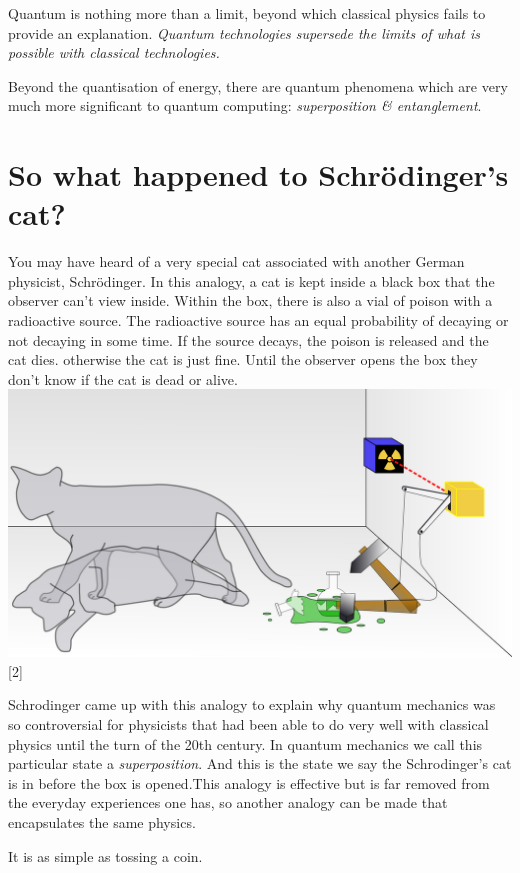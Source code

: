 \documentclass{book}
\begin{document}
Quantum is nothing more than a limit, beyond which classical physics fails to provide an explanation. \textit{Quantum technologies supersede the limits of what is possible with classical technologies.}

Beyond the quantisation of energy, there are quantum phenomena which are very much more significant to quantum computing: \textit{superposition \& entanglement}. 

\section{So what happened to Schrödinger’s cat?}

You may have heard of a very special cat associated with another German physicist, Schrödinger. In this analogy, a cat is kept inside a black box that the observer can't view inside. Within the box, there is also a vial of poison with a radioactive source. The radioactive source has an equal probability of decaying or not decaying in some time. If the source decays, the poison is released and the cat dies. otherwise the cat is just fine. Until the observer opens the box they don't know if the cat is dead or alive. 
\includegraphics[scale=0.3]{images/standard_cat.png}
[2]

Schrodinger came up with this analogy to explain why quantum mechanics was so controversial for physicists that had been able to do very well with classical physics until the turn of the 20th century. In quantum mechanics we call this particular state a \textit{superposition}. And this is the state we say the Schrodinger's cat is in before the box is opened.This analogy is effective but is far removed from the everyday experiences one has, so another analogy can be made that encapsulates the same physics. 


It is as simple as tossing a coin.  
\end{document}

